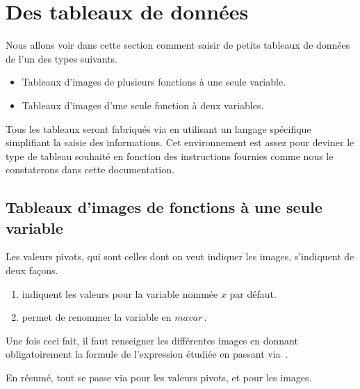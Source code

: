 \documentclass{tutodoc}
\begin{document}
\section{Des tableaux de données}

Nous allons voir dans cette section comment saisir de petits tableaux de données de l'un des types suivants.
\begin{itemize}
	\item Tableaux d'images de plusieurs fonctions à une seule variable.

	\item Tableaux d'images d'une seule fonction à deux variables.
\end{itemize}


\begin{tdocnote}
	Tous les tableaux seront fabriqués via  en utilisant un langage spécifique simplifiant la saisie des informations.
	Cet environnement est assez  pour deviner le type de tableau souhaité en fonction des instructions fournies comme nous le constaterons dans cette documentation.
\end{tdocnote}





\subsection{Tableaux d'images de fonctions à une seule variable}

Les valeurs pivots, qui sont celles dont on veut indiquer les images, s'indiquent de deux façons.
%
\begin{enumerate}
	\item {} indiquent les valeurs pour la variable nommée $x$ par défaut.

	\item {} permet de renommer la variable en $mavar$\,.
\end{enumerate}


Une fois ceci fait, il faut renseigner les différentes images en donnant obligatoirement la formule de l'expression étudiée en passant via \,.

\medskip

En résumé, tout se passe via  pour les valeurs pivots, et  pour les images.
\end{document}
